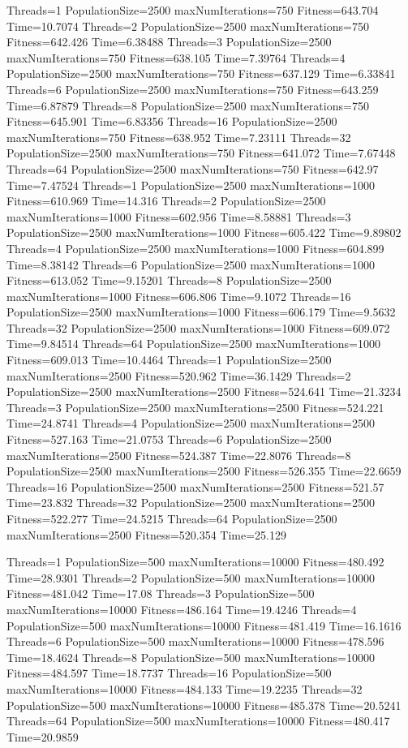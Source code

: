 \documentclass[10pt,letterpaper]{article}
\begin{document}
Threads=1 PopulationSize=2500 maxNumIterations=750 Fitness=643.704 Time=10.7074
Threads=2 PopulationSize=2500 maxNumIterations=750 Fitness=642.426 Time=6.38488
Threads=3 PopulationSize=2500 maxNumIterations=750 Fitness=638.105 Time=7.39764
Threads=4 PopulationSize=2500 maxNumIterations=750 Fitness=637.129 Time=6.33841
Threads=6 PopulationSize=2500 maxNumIterations=750 Fitness=643.259 Time=6.87879
Threads=8 PopulationSize=2500 maxNumIterations=750 Fitness=645.901 Time=6.83356
Threads=16 PopulationSize=2500 maxNumIterations=750 Fitness=638.952 Time=7.23111
Threads=32 PopulationSize=2500 maxNumIterations=750 Fitness=641.072 Time=7.67448
Threads=64 PopulationSize=2500 maxNumIterations=750 Fitness=642.97 Time=7.47524
Threads=1 PopulationSize=2500 maxNumIterations=1000 Fitness=610.969 Time=14.316
Threads=2 PopulationSize=2500 maxNumIterations=1000 Fitness=602.956 Time=8.58881
Threads=3 PopulationSize=2500 maxNumIterations=1000 Fitness=605.422 Time=9.89802
Threads=4 PopulationSize=2500 maxNumIterations=1000 Fitness=604.899 Time=8.38142
Threads=6 PopulationSize=2500 maxNumIterations=1000 Fitness=613.052 Time=9.15201
Threads=8 PopulationSize=2500 maxNumIterations=1000 Fitness=606.806 Time=9.1072
Threads=16 PopulationSize=2500 maxNumIterations=1000 Fitness=606.179 Time=9.5632
Threads=32 PopulationSize=2500 maxNumIterations=1000 Fitness=609.072 Time=9.84514
Threads=64 PopulationSize=2500 maxNumIterations=1000 Fitness=609.013 Time=10.4464
Threads=1 PopulationSize=2500 maxNumIterations=2500 Fitness=520.962 Time=36.1429
Threads=2 PopulationSize=2500 maxNumIterations=2500 Fitness=524.641 Time=21.3234
Threads=3 PopulationSize=2500 maxNumIterations=2500 Fitness=524.221 Time=24.8741
Threads=4 PopulationSize=2500 maxNumIterations=2500 Fitness=527.163 Time=21.0753
Threads=6 PopulationSize=2500 maxNumIterations=2500 Fitness=524.387 Time=22.8076
Threads=8 PopulationSize=2500 maxNumIterations=2500 Fitness=526.355 Time=22.6659
Threads=16 PopulationSize=2500 maxNumIterations=2500 Fitness=521.57 Time=23.832
Threads=32 PopulationSize=2500 maxNumIterations=2500 Fitness=522.277 Time=24.5215
Threads=64 PopulationSize=2500 maxNumIterations=2500 Fitness=520.354 Time=25.129





Threads=1 PopulationSize=500 maxNumIterations=10000 Fitness=480.492 Time=28.9301
Threads=2 PopulationSize=500 maxNumIterations=10000 Fitness=481.042 Time=17.08
Threads=3 PopulationSize=500 maxNumIterations=10000 Fitness=486.164 Time=19.4246
Threads=4 PopulationSize=500 maxNumIterations=10000 Fitness=481.419 Time=16.1616
Threads=6 PopulationSize=500 maxNumIterations=10000 Fitness=478.596 Time=18.4624
Threads=8 PopulationSize=500 maxNumIterations=10000 Fitness=484.597 Time=18.7737
Threads=16 PopulationSize=500 maxNumIterations=10000 Fitness=484.133 Time=19.2235
Threads=32 PopulationSize=500 maxNumIterations=10000 Fitness=485.378 Time=20.5241
Threads=64 PopulationSize=500 maxNumIterations=10000 Fitness=480.417 Time=20.9859
\end{document}
